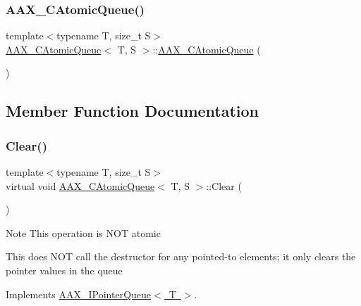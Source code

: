 \mbox{\label{a01441_ae048321b8d75f9fa073e6a24088d8260}} 
\subsubsection{\texorpdfstring{AAX\_CAtomicQueue()}{AAX\_CAtomicQueue()}}
{\footnotesize\ttfamily template$<$typename T, size\+\_\+t S$>$ \\
\mbox{\hyperlink{a01441}{A\+A\+X\+\_\+\+C\+Atomic\+Queue}}$<$ T, S $>$\+::\mbox{\hyperlink{a01441}{A\+A\+X\+\_\+\+C\+Atomic\+Queue}} (\begin{DoxyParamCaption}{ }\end{DoxyParamCaption})}



\subsection{Member Function Documentation}
\mbox{\label{a01441_a9819ff531e285f2acd2c9fd2351617c4}} 
\subsubsection{\texorpdfstring{Clear()}{Clear()}}
{\footnotesize\ttfamily template$<$typename T, size\+\_\+t S$>$ \\
virtual void \mbox{\hyperlink{a01441}{A\+A\+X\+\_\+\+C\+Atomic\+Queue}}$<$ T, S $>$\+::Clear (\begin{DoxyParamCaption}{ }\end{DoxyParamCaption})\hspace{0.3cm}{\ttfamily [virtual]}}





\begin{DoxyNote}{Note}
This operation is N\+OT atomic 

This does N\+OT call the destructor for any pointed-\/to elements; it only clears the pointer values in the queue 
\end{DoxyNote}


Implements \mbox{\hyperlink{a01861_a42bdf5794a2481d0ae3f294fd8f8203e}{A\+A\+X\+\_\+\+I\+Pointer\+Queue$<$ T $>$}}.

